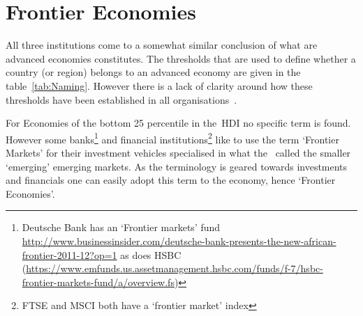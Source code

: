 


\section{Frontier Economies}

All three institutions come to a somewhat similar conclusion of what are advanced economies constitutes.
The thresholds that are used to define whether a country (or region) belongs to an advanced economy are given in the table~\ref{tab:Naming}.
However there is a lack of clarity around how these thresholds
have been established in all organisations~\cite{Nielsen:2011vq}.

For Economies of the bottom 25 percentile in the~\gls{HDI} no specific term is found.
However some banks\footnote{Deutsche Bank has an `Frontier markets' fund \url{http://www.businessinsider.com/deutsche-bank-presents-the-new-african-frontier-2011-12?op=1} as does HSBC (\url{https://www.emfunds.us.assetmanagement.hsbc.com/funds/f-7/hsbc-frontier-markets-fund/a/overview.fs})} and financial institutions\footnote{FTSE and MSCI both have a `frontier market' index} like to use the term `Frontier Markets' for their investment vehicles specialised in what the~\cite{WSJ:2007} called the smaller `emerging' emerging markets.
As the terminology is geared towards investments and financials one can easily adopt this term to the economy, hence `Frontier Economies'.
